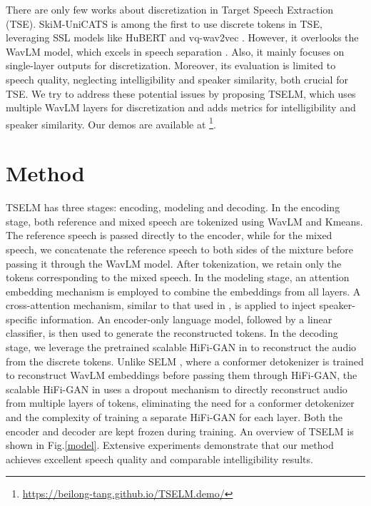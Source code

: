\documentclass[conference]{IEEEtran}
\begin{document}
There are only few works about discretization in Target Speech Extraction (TSE). SkiM-UniCATS \cite{gen_tse} is among the first to use discrete tokens in TSE, leveraging SSL models like HuBERT and vq-wav2vec \cite{vq_wav2vec}. However, it overlooks the WavLM model, which excels in speech separation \cite{wavlm}. Also, it mainly focuses on single-layer outputs for discretization. Moreover, its evaluation is limited to speech quality, neglecting intelligibility and speaker similarity, both crucial for TSE. We try to address these potential issues by proposing TSELM, which uses multiple WavLM layers for discretization and adds metrics for intelligibility and speaker similarity. Our demos are available at 
\footnote{\href{https://beilong-tang.github.io/TSELM.demo/}{https://beilong-tang.github.io/TSELM.demo/}}.


\section{Method}
TSELM has three stages: encoding, modeling and decoding. In the encoding stage, both reference and mixed speech are tokenized using WavLM and Kmeans. The reference speech is passed directly to the encoder, while for the mixed speech, we concatenate the reference speech to both sides of the mixture before passing it through the WavLM model. After tokenization, we retain only the tokens corresponding to the mixed speech.
In the modeling stage, an attention embedding mechanism is employed to combine the embeddings from all layers. A cross-attention mechanism, similar to that used in \cite{usef_tes}, is applied to inject speaker-specific information. An encoder-only language model, followed by a linear classifier, is then used to generate the reconstructed tokens.
In the decoding stage, we leverage the pretrained scalable HiFi-GAN in \cite{unit_hifi} to reconstruct the audio from the discrete tokens. Unlike SELM \cite{selm}, where a conformer detokenizer is trained to reconstruct WavLM embeddings before passing them through HiFi-GAN, the scalable HiFi-GAN in \cite{unit_hifi} uses a dropout mechanism to directly reconstruct audio from multiple layers of tokens, eliminating the need for a conformer detokenizer and the complexity of training a separate HiFi-GAN for each layer. Both the encoder and decoder are kept frozen during training. An overview of TSELM is shown in Fig.\ref{model}.
Extensive experiments demonstrate that our method achieves excellent speech quality and comparable intelligibility results.
\end{document}
